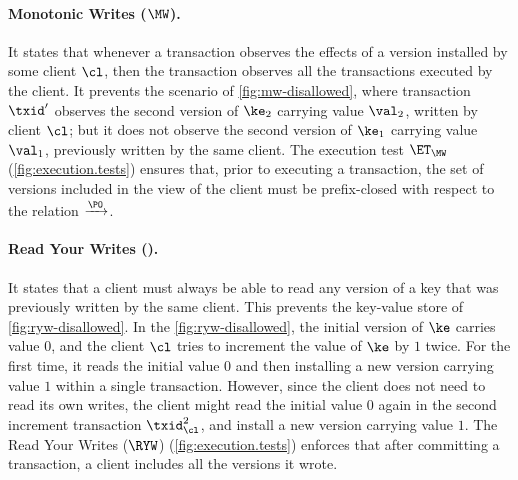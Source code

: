 \paragraph{Monotonic Writes ($\MW$).}
It states that whenever a transaction observes the effects of a version installed by some client $\cl$,
then the transaction observes all the transactions executed by the client. 
It prevents the scenario of \cref{fig:mw-disallowed}, 
where transaction $\txid'$ observes the second version of $\ke_2$ carrying value $\val_2$, written by client $\cl$;
but it does not observe the second version of $\ke_1$ carrying value $\val_1$, previously written by the same client.
The execution test $\ET_{\MW}$ (\cref{fig:execution.tests}) ensures that, prior to executing a transaction,
the set of versions included in the view of the client must be prefix-closed with respect to the relation $\xrightarrow{\PO}$.

\paragraph{Read Your Writes (\RYW).}
It states that a client must always be able to read any version of a key that was previously written by the same client.
This prevents the key-value store of \cref{fig:ryw-disallowed}. 
In the \cref{fig:ryw-disallowed}, the initial version of $\ke$ carries value $0$, 
and the client $\cl$ tries to increment the value of $\ke$ by $1$ twice.
For the first time, it reads the initial value $0$ and then installing a new version carrying  value $1$ within a single transaction.
However, since the client does not need to read its own writes, 
the client might read the initial value $0$ again in the second increment transaction \( \txid_\cl^2 \),
and install a new version carrying value $1$.
The Read Your Writes ($\RYW$) (\cref{fig:execution.tests}) enforces that after committing a transaction, 
a client includes all the versions it wrote.  

